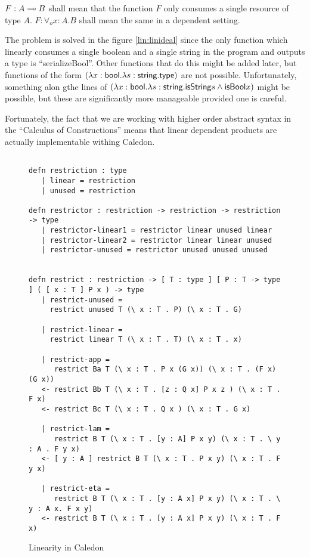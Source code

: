 $F : A \multimap B$ shall mean that the function $F$ only consumes a single resource of type $A$.  
$F : \forall_o x : A . B$ shall mean the same in a dependent setting.


The problem is solved in the figure \ref{lin:linideal} since the only function which linearly 
consumes a single boolean and a single string in the program and outputs a type is ``serializeBool''.  
Other functions that do this might be added later, but functions of the form 
$(\lambda x : \mathsf{bool}. \lambda s : \mathsf{string} . \mathsf{type})$ are not possible.  
Unfortunately, something alon gthe lines of 
$(\lambda x : \mathsf{bool}. \lambda s : \mathsf{string} . \mathsf{isString} s \wedge \mathsf{isBool} x)$ might be possible, 
but these are significantly more manageable provided one is careful.  

Fortunately, the fact that we are working with higher order abstract syntax in the ``Calculus of Constructions''
means that linear dependent products are actually implementable withing Caledon.


\begin{figure}[H]
\begin{lstlisting}

defn restriction : type
   | linear = restriction
   | unused = restriction

defn restrictor : restriction -> restriction -> restriction -> type
   | restrictor-linear1 = restrictor linear unused linear
   | restrictor-linear2 = restrictor linear linear unused 
   | restrictor-unused = restrictor unused unused unused


defn restrict : restriction -> [ T : type ] [ P : T -> type ] ( [ x : T ] P x ) -> type
   | restrict-unused = 
     restrict unused T (\ x : T . P) (\ x : T . G)

   | restrict-linear = 
     restrict linear T (\ x : T . T) (\ x : T . x)

   | restrict-app = 
      restrict Ba T (\ x : T . P x (G x)) (\ x : T . (F x) (G x))
   <- restrict Bb T (\ x : T . [z : Q x] P x z ) (\ x : T . F x)
   <- restrict Bc T (\ x : T . Q x ) (\ x : T . G x)

   | restrict-lam = 
      restrict B T (\ x : T . [y : A] P x y) (\ x : T . \ y : A . F y x)
   <- [ y : A ] restrict B T (\ x : T . P x y) (\ x : T . F y x)

   | restrict-eta = 
      restrict B T (\ x : T . [y : A x] P x y) (\ x : T . \ y : A x. F x y)
   <- restrict B T (\ x : T . [y : A x] P x y) (\ x : T . F x)

\end{lstlisting}
\caption{Linearity in Caledon}
\label{lin:linimp}
\end{figure}

